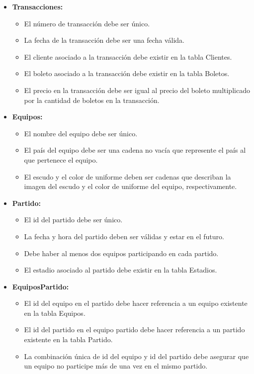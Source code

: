 \begin{itemize}
    \item \textbf{Transacciones:} 
        \begin{itemize}
            \item El número de transacción debe ser único.
            \item La fecha de la transacción debe ser una fecha válida.
            \item El cliente asociado a la transacción debe existir en la tabla Clientes.
            \item El boleto asociado a la transacción debe existir en la tabla Boletos.
            \item El precio en la transacción debe ser igual al precio del boleto multiplicado por la cantidad de boletos en la transacción.
        \end{itemize}

    \item \textbf{Equipos:} 
        \begin{itemize}
            \item El nombre del equipo debe ser único.
            \item El país del equipo debe ser una cadena no vacía que represente el país al que pertenece el equipo.
            \item El escudo y el color de uniforme deben ser cadenas que describan la imagen del escudo y el color de uniforme del equipo, respectivamente.
        \end{itemize}    
    
    \item \textbf{Partido:} 
    \begin{itemize}
        \item El id del partido debe ser único.
        \item La fecha y hora del partido deben ser válidas y estar en el futuro.
        \item Debe haber al menos dos equipos participando en cada partido.
        \item El estadio asociado al partido debe existir en la tabla Estadios.
    \end{itemize}
        
    \item \textbf{EquiposPartido:} 
    \begin{itemize}
        \item El id del equipo en el partido debe hacer referencia a un equipo existente en la tabla Equipos.
        \item El id del partido en el equipo partido debe hacer referencia a un partido existente en la tabla Partido.
        \item La combinación única de id del equipo y id del partido debe asegurar que un equipo no participe más de una vez en el mismo partido.
    \end{itemize}
\end{itemize}

